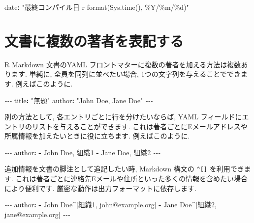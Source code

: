 \documentclass[
  11pt,
]{bxjsreport}
\newenvironment{Shaded}{\begin{snugshade}}{\end{snugshade}}
\newcommand{\AttributeTok}[1]{\textcolor[rgb]{0.77,0.63,0.00}{#1}}
\newcommand{\FunctionTok}[1]{\textcolor[rgb]{0.00,0.00,0.00}{#1}}
\newcommand{\KeywordTok}[1]{\textcolor[rgb]{0.13,0.29,0.53}{\textbf{#1}}}
\newcommand{\PreprocessorTok}[1]{\textcolor[rgb]{0.56,0.35,0.01}{\textit{#1}}}
\newcommand{\StringTok}[1]{\textcolor[rgb]{0.31,0.60,0.02}{#1}}
\begin{document}
\begin{Shaded}
\begin{Highlighting}[]
\FunctionTok{date}\KeywordTok{:}\AttributeTok{ }\StringTok{"最終コンパイル日 \textasciigrave{}r format(Sys.time(), \textquotesingle{}\%Y/\%m/\%d\textquotesingle{})\textasciigrave{}"}
\end{Highlighting}
\end{Shaded}

\hypertarget{multiple-authors}{%
\section{文書に複数の著者を表記する}\label{multiple-authors}}

R Markdown 文書のYAML フロントマターに複数の著者を加える方法は複数あります. 単純に, 全員を同列に並べたい場合, 1つの文字列を与えることでできます. 例えばこのように.

\begin{Shaded}
\begin{Highlighting}[]
\PreprocessorTok{{-}{-}{-}}
\FunctionTok{title}\KeywordTok{:}\AttributeTok{ }\StringTok{"無題"}
\FunctionTok{author}\KeywordTok{:}\AttributeTok{ }\StringTok{"John Doe, Jane Doe"}
\PreprocessorTok{{-}{-}{-}}
\end{Highlighting}
\end{Shaded}

別の方法として, 各エントリごとに行を分けたいならば, YAML フィールドにエントリのリストを与えることができます. これは著者ごとにEメールアドレスや所属情報を加えたいときに役に立ちます. 例えばこのように.

\begin{Shaded}
\begin{Highlighting}[]
\PreprocessorTok{{-}{-}{-}}
\FunctionTok{author}\KeywordTok{:}
\AttributeTok{  }\KeywordTok{{-}}\AttributeTok{ John Doe, 組織1}
\AttributeTok{  }\KeywordTok{{-}}\AttributeTok{ Jane Doe, 組織2}
\PreprocessorTok{{-}{-}{-}}
\end{Highlighting}
\end{Shaded}

追加情報を文書の脚注として追記したい時, Markdown 構文の \texttt{\^{}{[}{]}} を利用できます. これは著者ごとに連絡先Eメールや住所といった多くの情報を含めたい場合により便利です. 厳密な動作は出力フォーマットに依存します.

\begin{Shaded}
\begin{Highlighting}[]
\PreprocessorTok{{-}{-}{-}}
\FunctionTok{author}\KeywordTok{:}
\AttributeTok{  }\KeywordTok{{-}}\AttributeTok{ John Doe\^{}[組織1, john@example.org]}
\AttributeTok{  }\KeywordTok{{-}}\AttributeTok{ Jane Doe\^{}[組織2, jane@example.org]}
\PreprocessorTok{{-}{-}{-}}
\end{Highlighting}
\end{Shaded}
\end{document}
